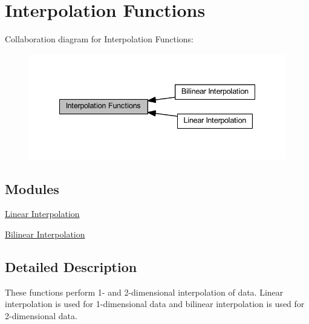 \hypertarget{group__group_interpolation}{}\section{Interpolation Functions}
\label{group__group_interpolation}
Collaboration diagram for Interpolation Functions\+:
\nopagebreak
\begin{figure}[H]
\begin{center}
\leavevmode
\includegraphics[width=335pt]{group__group_interpolation}
\end{center}
\end{figure}
\subsection*{Modules}
\begin{DoxyCompactItemize}
\item 
\hyperlink{group___linear_interpolate}{Linear Interpolation}
\item 
\hyperlink{group___bilinear_interpolate}{Bilinear Interpolation}
\end{DoxyCompactItemize}


\subsection{Detailed Description}
These functions perform 1-\/ and 2-\/dimensional interpolation of data. Linear interpolation is used for 1-\/dimensional data and bilinear interpolation is used for 2-\/dimensional data. 